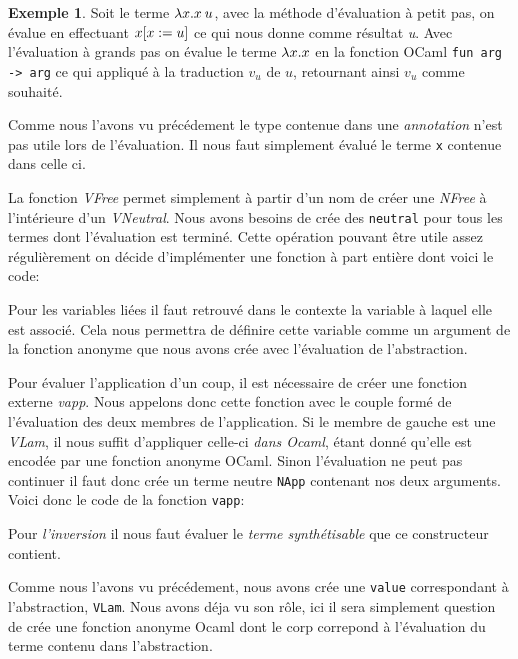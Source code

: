 \documentclass {article}
\newcommand{\codefrom}[3]
           {}
\theoremstyle{definition}
\newtheorem{example}{Exemple}
\theoremstyle{remark}
\newcommand{\fun}[1]{\lstinline!#1!}
\begin{document}
\begin{example}
  Soit le terme \(\lambda x. x\:u\), avec la méthode
  d'évaluation à petit pas, on évalue en effectuant $x[x := u]$
  ce qui nous donne comme résultat \emph{u}.  Avec l'évaluation à
  grands pas on évalue le terme $\lambda x. x$ en la fonction OCaml
  \lstinline!fun arg -> arg! ce qui appliqué à la traduction $v_u$ de
  $u$, retournant ainsi $v_u$ comme souhaité.
\end{example}


\codefrom{typed}{lambda}{big_step_eval_exTm_ann}
Comme nous l'avons vu précédement le type contenue dans une \emph{annotation} n'est pas utile lors de l'évaluation.
Il nous faut simplement évalué le terme \fun{x} contenue dans celle ci.

\codefrom{typed}{lambda}{big_step_eval_exTm_var}

La fonction \emph{VFree} permet simplement à partir d'un nom de créer
une \emph{NFree} à l'intérieure d'un \emph{VNeutral}. Nous avons besoins
de crée des \fun{neutral} pour tous les termes dont l'évaluation est terminé.
Cette opération pouvant être utile assez régulièrement on décide d'implémenter
une fonction à part entière dont voici le code:
\codefrom{typed}{lambda}{vfree}

Pour les variables liées il faut retrouvé dans le contexte la variable à laquel elle est associé.
Cela nous permettra de définire cette variable comme un argument de la fonction anonyme que nous avons
crée avec l'évaluation de l'abstraction.

\codefrom{typed}{lambda}{big_step_eval_exTm_app}

Pour évaluer l'application d'un coup, il est nécessaire de créer une fonction externe \emph{vapp}.
Nous appelons donc cette fonction avec le couple formé de l'évaluation des deux membres de l'application.
Si le membre de gauche est une \emph{VLam}, il nous suffit d'appliquer celle-ci \emph{dans Ocaml},
étant donné qu'elle est encodée par une fonction anonyme OCaml. Sinon l'évaluation ne peut pas continuer
il faut donc crée un terme neutre \fun{NApp} contenant nos deux arguments. Voici donc le code de
la fonction \fun{vapp}:

\codefrom{typed}{lambda}{vapp}

\codefrom{typed}{lambda}{big_step_eval_inTm_inv}
Pour \emph{l'inversion} il nous faut évaluer le \emph{terme synthétisable} que ce constructeur contient.

\codefrom{typed}{lambda}{big_step_eval_inTm_abs}
Comme nous l'avons vu précédement, nous avons crée une \fun{value} correspondant
à l'abstraction, \fun{VLam}. Nous avons déja vu son rôle, ici il sera simplement question
de crée une fonction anonyme Ocaml dont le corp correpond à l'évaluation du terme
contenu dans l'abstraction.
\end{document}
